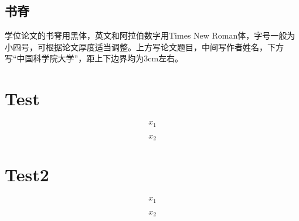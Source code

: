 \subsection{书脊}
学位论文的书脊用黑体，英文和阿拉伯数字用Times New Roman体，字号一般为小四号，可根据论文厚度适当调整。上方写论文题目，中间写作者姓名，下方写“中国科学院大学”，距上下边界均为3cm左右。

\section{Test}
\begin{equation}
    x_1
\end{equation}

\begin{equation}
    x_2
\end{equation}

\section{Test2}
\begin{equation}
    x_1
\end{equation}

\begin{equation}
    x_2
\end{equation}